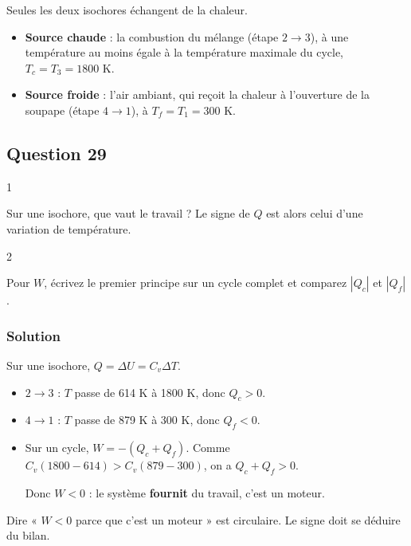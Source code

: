 \documentclass[11pt,a4paper]{article}
\providecommand{\tightlist}{\setlength{\itemsep}{0pt}\setlength{\parskip}{0pt}}
\begin{document}
Seules les deux isochores échangent de la chaleur.

\begin{itemize}
\tightlist
\item
  \textbf{Source chaude} : la combustion du mélange (étape \(2\to3\)), à une température au moins égale à la température maximale du cycle, \(T_c=T_3=1800\) K.
\item
  \textbf{Source froide} : l'air ambiant, qui reçoit la chaleur à l'ouverture de la soupape (étape \(4\to1\)), à \(T_f=T_1=300\) K.
\end{itemize}

\hypertarget{question-29}{%
\subsection{Question 29}\label{question-29}}

\begin{indication}{1}

Sur une isochore, que vaut le travail ? Le signe de \(Q\) est alors celui d'une variation de température.

\end{indication}

\begin{indication}{2}

Pour \(W\), écrivez le premier principe sur un cycle complet et comparez \(|Q_c|\) et \(|Q_f|\).

\end{indication}

\hypertarget{solution-28}{%
\subsubsection{Solution}\label{solution-28}}

Sur une isochore, \(Q=\Delta U=C_v\Delta T\).

\begin{itemize}
\item
  \(2\to3\) : \(T\) passe de 614 K à 1800 K, donc \(Q_c>0\).
\item
  \(4\to1\) : \(T\) passe de 879 K à 300 K, donc \(Q_f<0\).
\item
  Sur un cycle, \(W=-(Q_c+Q_f)\). Comme \(C_v(1800-614)>C_v(879-300)\), on a \(Q_c+Q_f>0\).

  Donc \(W<0\) : le système \textbf{fournit} du travail, c'est un moteur.
\end{itemize}

\begin{piege}

Dire « \(W<0\) parce que c'est un moteur » est circulaire. Le signe doit se déduire du bilan.

\end{piege}
\end{document}
